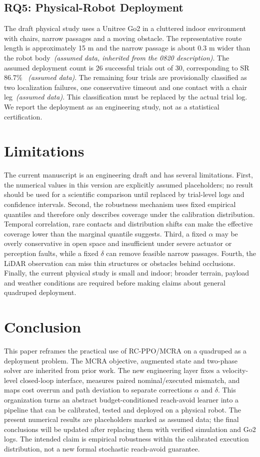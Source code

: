 \documentclass{article}
\begin{document}
\subsection{RQ5: Physical-Robot Deployment}
The draft physical study uses a Unitree Go2 in a cluttered indoor environment with
chairs, narrow passages and a moving obstacle. The representative route length is
approximately 15 m and the narrow passage is about 0.3 m wider than the robot
body~\textit{(assumed data, inherited from the 0820 description)}. The assumed
deployment count is 26 successful trials out of 30, corresponding to SR $86.7\%$
~\textit{(assumed data)}. The remaining four trials are provisionally classified as
two localization failures, one conservative timeout and one contact with a chair
leg~\textit{(assumed data)}. This classification must be replaced by the actual
trial log. We report the deployment as an engineering study, not as a statistical
certification.

\section{Limitations}
The current manuscript is an engineering draft and has several limitations. First,
the numerical values in this version are explicitly assumed placeholders; no result
should be used for a scientific comparison until replaced by trial-level logs and
confidence intervals. Second, the robustness mechanism uses fixed empirical
quantiles and therefore only describes coverage under the calibration distribution.
Temporal correlation, rare contacts and distribution shifts can make the effective
coverage lower than the marginal quantile suggests. Third, a fixed $\alpha$ may be
overly conservative in open space and insufficient under severe actuator or
perception faults, while a fixed $\delta$ can remove feasible narrow passages.
Fourth, the LiDAR observation can miss thin structures or obstacles behind
occlusions. Finally, the current physical study is small and indoor; broader
terrain, payload and weather conditions are required before making claims about
general quadruped deployment.

\section{Conclusion}
This paper reframes the practical use of RC-PPO/MCRA on a quadruped as a deployment
problem. The MCRA objective, augmented state and two-phase solver are inherited
from prior work. The new engineering layer fixes a velocity-level closed-loop
interface, measures paired nominal/executed mismatch, and maps cost overrun and
path deviation to separate corrections $\alpha$ and $\delta$. This organization
turns an abstract budget-conditioned reach-avoid learner into a pipeline that can
be calibrated, tested and deployed on a physical robot. The present numerical
results are placeholders marked as assumed data; the final conclusions will be
updated after replacing them with verified simulation and Go2 logs. The intended
claim is empirical robustness within the calibrated execution distribution, not a
new formal stochastic reach-avoid guarantee.
\end{document}
